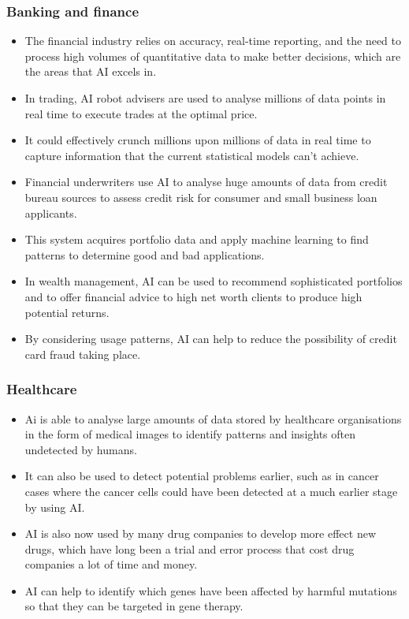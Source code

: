 \documentclass[11pt]{article}
\begin{document}
\subsubsection{Banking and finance}
\label{sec:org9f775d1}
\begin{itemize}
\item The financial industry relies on accuracy, real-time reporting, and the need to process high volumes of quantitative data to make better decisions, which are the areas that AI excels in.
\item In trading, AI robot advisers are used to analyse millions of data points in real time to execute trades at the optimal price.
\item It could effectively crunch millions upon millions of data in real time to capture information that the current statistical models can't achieve.
\item Financial underwriters use AI to analyse huge amounts of data from credit bureau sources to assess credit risk for consumer and small business loan applicants.
\item This system acquires portfolio data and apply machine learning to find patterns to determine good and bad applications.
\item In wealth management, AI can be used to recommend sophisticated portfolios and to offer financial advice to high net worth clients to produce high potential returns.
\item By considering usage patterns, AI can help to reduce the possibility of credit card fraud taking place.
\end{itemize}

\subsubsection{Healthcare}
\label{sec:orgb0515c7}
\begin{itemize}
\item Ai is able to analyse large amounts of data stored by healthcare organisations in the form of medical images to identify patterns and insights often undetected by humans.
\item It can also be used to detect potential problems earlier, such as in cancer cases where the cancer cells could have been detected at a much earlier stage by using AI.
\item AI is also now used by many drug companies to develop more effect new drugs, which have long been a trial and error process that cost drug companies a lot of time and money.
\item AI can help to identify which genes have been affected by harmful mutations so that they can be targeted in gene therapy.
\end{itemize}
\end{document}
